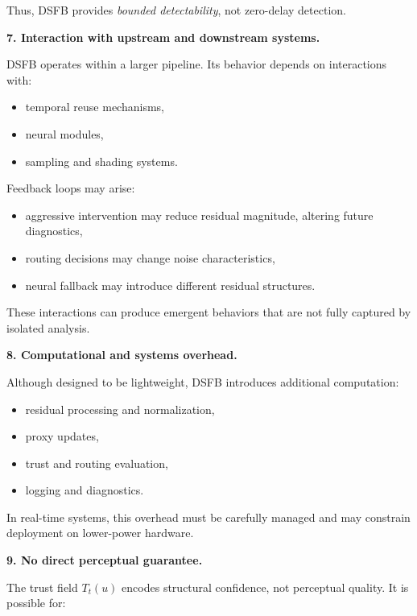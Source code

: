 \documentclass[11pt,letterpaper]{article}
\theoremstyle{gcresult}
\theoremstyle{definition}
\begin{document}
Thus, DSFB provides \emph{bounded detectability}, not zero-delay detection.

\vspace{0.5em}
\noindent
\textbf{7. Interaction with upstream and downstream systems.}

DSFB operates within a larger pipeline. Its behavior depends on interactions with:

\begin{itemize}[leftmargin=1.5em]
    \item temporal reuse mechanisms,
    \item neural modules,
    \item sampling and shading systems.
\end{itemize}

Feedback loops may arise:

\begin{itemize}[leftmargin=1.5em]
    \item aggressive intervention may reduce residual magnitude, altering future diagnostics,
    \item routing decisions may change noise characteristics,
    \item neural fallback may introduce different residual structures.
\end{itemize}

These interactions can produce emergent behaviors that are not fully captured by isolated analysis.

\vspace{0.5em}
\noindent
\textbf{8. Computational and systems overhead.}

Although designed to be lightweight, DSFB introduces additional computation:

\begin{itemize}[leftmargin=1.5em]
    \item residual processing and normalization,
    \item proxy updates,
    \item trust and routing evaluation,
    \item logging and diagnostics.
\end{itemize}

In real-time systems, this overhead must be carefully managed and may constrain deployment on lower-power hardware.

\vspace{0.5em}
\noindent
\textbf{9. No direct perceptual guarantee.}

The trust field $T_t(u)$ encodes structural confidence, not perceptual quality. It is possible for:
\end{document}
